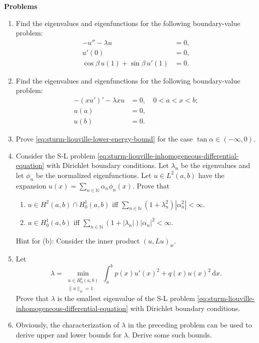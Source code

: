 \textbf{Problems}

\begin{enumerate}[label=\thesection.\arabic*.,ref=\thesection.\arabic*,start=48,series=book-problems]

\item\label{ex:sturm-liouville-neumann-robin-spectrum} Find the eigenvalues and eigenfunctions for the following boundary-value problem:\[\begin{aligned}
-u''-\lambda u&=0,\\
u'(0)&=0,\\
\cos\beta\,u(1)+\sin\beta\,u'(1)&=0.
\end{aligned}\]

\item\label{ex:sturm-liouville-weight-x-dirichlet-spectrum} Find the eigenvalues and eigenfunctions for the following boundary-value problem:\[\begin{aligned}
-(xu')'-\lambda xu&=0,\quad0<a<x<b;\\
u(a)&=0,\\
u(b)&=0.
\end{aligned}\]

\item\label{ex:sturm-liouville-general-energy-bound} Prove \eqref{eq:sturm-liouville-lower-energy-bound} for the case $\tan\alpha\in(-\infty,0)$.

\item\label{ex:sturm-liouville-spectral-sobolev-characterizations} Consider the S-L problem \eqref{eq:sturm-liouville-inhomogeneous-differential-equation} with Dirichlet boundary conditions. Let $\lambda_n$ be the eigenvalues and let $\phi_n$ be the normalized eigenfunctions. Let $u\in L^2(a,b)$ have the expansion $u(x)=\sum_{n\in\mathbb{N}}\alpha_n\phi_n(x)$. Prove that\begin{enumerate}[label=(\alph*)]\item $u\in H^2(a,b)\cap H_0^1(a,b)$ iff $\sum_{n\in\mathbb{N}}(1+\lambda_n^2)|\alpha_n^2|<\infty$.\item $u\in H_0^1(a,b)$ iff $\sum_{n\in\mathbb{N}}(1+|\lambda_n|)|\alpha_n|^2<\infty$.\end{enumerate}Hint for (b): Consider the inner product $(u,Lu)_w$.

\item\label{ex:sturm-liouville-smallest-eigenvalue-variational-characterization} Let
\begin{equation}\label{eq:sturm-liouville-first-eigenvalue-variational-problem}
\lambda=\min_{\substack{u\in H_0^1(a,b)\\\|u\|_w=1}}\int_a^bp(x)u'(x)^2+q(x)u(x)^2\,\mathrm{d}x.
\end{equation}
Prove that $\lambda$ is the smallest eigenvalue of the S-L problem \eqref{eq:sturm-liouville-inhomogeneous-differential-equation} with Dirichlet boundary conditions.

\item\label{ex:sturm-liouville-variational-eigenvalue-bounds} Obviously, the characterization of $\lambda$ in the preceding problem can be used to derive upper and lower bounds for $\lambda$. Derive some such bounds.

\end{enumerate}
